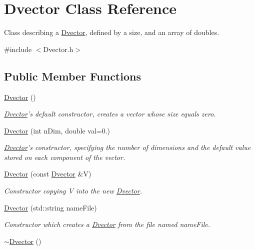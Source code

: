 \hypertarget{classDvector}{\section{Dvector Class Reference}
\label{classDvector}
}


Class describing a \hyperlink{classDvector}{Dvector}, defined by a size, and an array of doubles.  




{\ttfamily \#include $<$Dvector.\-h$>$}

\subsection*{Public Member Functions}
\begin{DoxyCompactItemize}
\item 
\hypertarget{classDvector_adf0f620df0feef3311f7d198e649a298}{\hyperlink{classDvector_adf0f620df0feef3311f7d198e649a298}{Dvector} ()}\label{classDvector_adf0f620df0feef3311f7d198e649a298}

\begin{DoxyCompactList}\small\item\em \hyperlink{classDvector}{Dvector}'s default constructor, creates a vector whose size equals zero. \end{DoxyCompactList}\item 
\hyperlink{classDvector_a38a505f0d98190f86d6a6d84b1c1854e}{Dvector} (int n\-Dim, double val=0.)
\begin{DoxyCompactList}\small\item\em \hyperlink{classDvector}{Dvector}'s constructor, specifying the number of dimensions and the default value stored on each component of the vector. \end{DoxyCompactList}\item 
\hyperlink{classDvector_a6ca045c78602ab23be94e8701669a73f}{Dvector} (const \hyperlink{classDvector}{Dvector} \&V)
\begin{DoxyCompactList}\small\item\em Constructor copying V into the new \hyperlink{classDvector}{Dvector}. \end{DoxyCompactList}\item 
\hyperlink{classDvector_a714f54f3fa82fa9d4f61819dc4f86cc1}{Dvector} (std\-::string name\-File)
\begin{DoxyCompactList}\small\item\em Constructor which creates a \hyperlink{classDvector}{Dvector} from the file named name\-File. \end{DoxyCompactList}\item 
\hypertarget{classDvector_a3156d0776c5da1a15685970200ec6b96}{\hyperlink{classDvector_a3156d0776c5da1a15685970200ec6b96}{$\sim$\-Dvector} ()}\label{classDvector_a3156d0776c5da1a15685970200ec6b96}


\end{DoxyCompactItemize}

